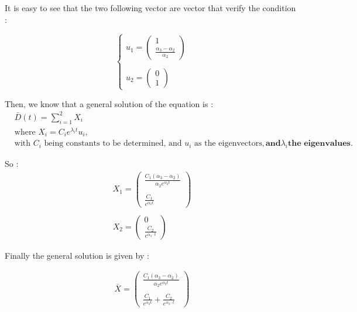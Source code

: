 \documentclass{article}
\begin{document}
	It is easy to see that the two following vector are vector that verify the condition : 
	
	\[
	\begin{cases}
		u_1=\begin{pmatrix}
			1 \\
			\frac{\alpha_3-\alpha_2}{\alpha_2}
		\end{pmatrix} \\ \\
		u_2=\begin{pmatrix}
			0 \\
			1
		\end{pmatrix}
	\end{cases}
	\]
	
	Then, we know that a general solution of the equation is : 
	\begin{align*}
		&\bar{D}
		(t) = \sum_{i=1}^2 X_i \\
		&\text{where } X_i = C_i e^{\lambda_it} u_i, \\
		&\text{with } C_i \text{ being constants to be determined, and } u_i \text{ as the eigenvectors}, \textbf{and} \lambda_i \textbf{the eigenvalues}.
	\end{align*}
	
	So : 
	\begin{align*}
		X_1=\begin{pmatrix}
			\frac{C_1(\alpha_3-\alpha_2)}{\alpha_2e^{\alpha_2t}} \\ \\
			\frac{C_1}{e^{\alpha_2t}}
		\end{pmatrix} \\ \\ 
		X_2=\begin{pmatrix}
			0 \\
			\frac{C_2}{e^{\alpha_3 \cdot t}}
		\end{pmatrix}
	\end{align*}
	
	Finally the general solution is given by : 
	
	\begin{align*}
		\bar{X}
		=\begin{pmatrix}
			\frac{C_1(\alpha_3-\alpha_2)}{\alpha_2e^{\alpha_2t}} \\ \\
			\frac{C_1}{e^{\alpha_2t}} + \frac{C_2}{e^{\alpha_3 \cdot t}}
		\end{pmatrix} \\ \\ 
	\end{align*}
	
\end{document}
